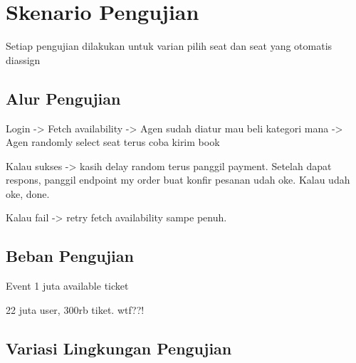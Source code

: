 \section{Skenario Pengujian}

Setiap pengujian dilakukan untuk varian pilih seat dan seat yang otomatis diassign

\subsection{Alur Pengujian}

Login -> Fetch availability -> Agen sudah diatur mau beli kategori mana -> Agen randomly select seat terus coba kirim book

Kalau sukses -> kasih delay random terus panggil payment. Setelah dapat respons, panggil endpoint my order buat konfir pesanan udah oke. Kalau udah oke, done.

Kalau fail -> retry fetch availability sampe penuh.

\subsection{Beban Pengujian}

Event 1 juta available ticket


22 juta user, 300rb tiket. wtf??!



\subsection{Variasi Lingkungan Pengujian}